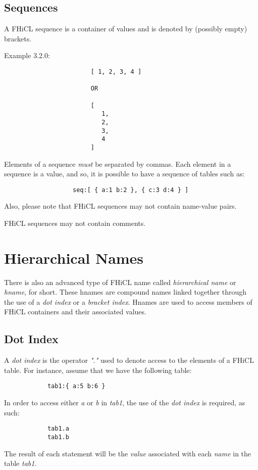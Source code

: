 \documentclass{memarticle}
\begin{document}
        \section{Sequences}
                A FHiCL sequence is a container of values
                and is denoted by (possibly empty) brackets.
                \par
                Example 3.2.0:
                \begin{verbatim}
                        [ 1, 2, 3, 4 ]
                        
                        OR

                        [
                           1,
                           2,
                           3,
                           4
                        ]
                \end{verbatim}
                \par
                Elements of a sequence \emph{must} be separated by commas.
                Each element in a sequence is a value, and so,
                it is possible to have a sequence of tables such as:
                \begin{verbatim}
                   seq:[ { a:1 b:2 }, { c:3 d:4 } ]
                \end{verbatim}
                \par
                Also, please note that FHiCL sequences may not contain name-value pairs.
                \par
                FHiCL sequences may not contain comments.
\chapter{Hierarchical Names}
        \par
        There is also an advanced type of FHiCL name called
        \emph{hierarchical name} or \emph{hname}, for short.
        These hnames are compound names linked together through the use of
        a \emph{dot index} or a \emph{bracket index}.
        Hnames are used to access members of FHiCL containers
        and their associated values.
	\section{Dot Index}
		A \emph{dot index} is the operator \emph{"."} used to denote access to the elements of a FHiCL table.
		For instance, assume that we have the following table:
		\par
		\begin{verbatim}
			tab1:{ a:5 b:6 }
		\end{verbatim}
		In order to access either \emph{a} or \emph{b} in \emph{tab1},
		the use of the \emph{dot index} is required, as such:
		\begin{verbatim}
			tab1.a
			tab1.b
		\end{verbatim}
		The result of each statement will be the \emph{value} associated with each \emph{name} in the table \emph{tab1}.
\end{document}
